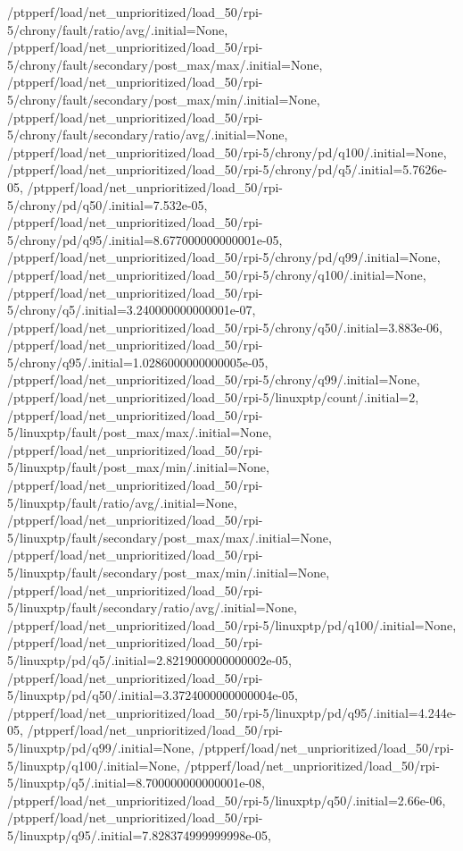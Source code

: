 {    /ptpperf/load/net_unprioritized/load_50/rpi-5/chrony/fault/ratio/avg/.initial=None,
    /ptpperf/load/net_unprioritized/load_50/rpi-5/chrony/fault/secondary/post_max/max/.initial=None,
    /ptpperf/load/net_unprioritized/load_50/rpi-5/chrony/fault/secondary/post_max/min/.initial=None,
    /ptpperf/load/net_unprioritized/load_50/rpi-5/chrony/fault/secondary/ratio/avg/.initial=None,
    /ptpperf/load/net_unprioritized/load_50/rpi-5/chrony/pd/q100/.initial=None,
    /ptpperf/load/net_unprioritized/load_50/rpi-5/chrony/pd/q5/.initial=5.7626e-05,
    /ptpperf/load/net_unprioritized/load_50/rpi-5/chrony/pd/q50/.initial=7.532e-05,
    /ptpperf/load/net_unprioritized/load_50/rpi-5/chrony/pd/q95/.initial=8.677000000000001e-05,
    /ptpperf/load/net_unprioritized/load_50/rpi-5/chrony/pd/q99/.initial=None,
    /ptpperf/load/net_unprioritized/load_50/rpi-5/chrony/q100/.initial=None,
    /ptpperf/load/net_unprioritized/load_50/rpi-5/chrony/q5/.initial=3.240000000000001e-07,
    /ptpperf/load/net_unprioritized/load_50/rpi-5/chrony/q50/.initial=3.883e-06,
    /ptpperf/load/net_unprioritized/load_50/rpi-5/chrony/q95/.initial=1.0286000000000005e-05,
    /ptpperf/load/net_unprioritized/load_50/rpi-5/chrony/q99/.initial=None,
    /ptpperf/load/net_unprioritized/load_50/rpi-5/linuxptp/count/.initial=2,
    /ptpperf/load/net_unprioritized/load_50/rpi-5/linuxptp/fault/post_max/max/.initial=None,
    /ptpperf/load/net_unprioritized/load_50/rpi-5/linuxptp/fault/post_max/min/.initial=None,
    /ptpperf/load/net_unprioritized/load_50/rpi-5/linuxptp/fault/ratio/avg/.initial=None,
    /ptpperf/load/net_unprioritized/load_50/rpi-5/linuxptp/fault/secondary/post_max/max/.initial=None,
    /ptpperf/load/net_unprioritized/load_50/rpi-5/linuxptp/fault/secondary/post_max/min/.initial=None,
    /ptpperf/load/net_unprioritized/load_50/rpi-5/linuxptp/fault/secondary/ratio/avg/.initial=None,
    /ptpperf/load/net_unprioritized/load_50/rpi-5/linuxptp/pd/q100/.initial=None,
    /ptpperf/load/net_unprioritized/load_50/rpi-5/linuxptp/pd/q5/.initial=2.8219000000000002e-05,
    /ptpperf/load/net_unprioritized/load_50/rpi-5/linuxptp/pd/q50/.initial=3.3724000000000004e-05,
    /ptpperf/load/net_unprioritized/load_50/rpi-5/linuxptp/pd/q95/.initial=4.244e-05,
    /ptpperf/load/net_unprioritized/load_50/rpi-5/linuxptp/pd/q99/.initial=None,
    /ptpperf/load/net_unprioritized/load_50/rpi-5/linuxptp/q100/.initial=None,
    /ptpperf/load/net_unprioritized/load_50/rpi-5/linuxptp/q5/.initial=8.700000000000001e-08,
    /ptpperf/load/net_unprioritized/load_50/rpi-5/linuxptp/q50/.initial=2.66e-06,
    /ptpperf/load/net_unprioritized/load_50/rpi-5/linuxptp/q95/.initial=7.828374999999998e-05,
}
